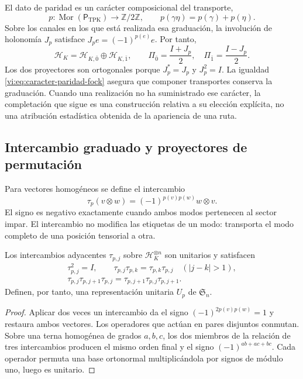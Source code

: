 El dato de paridad es un carácter composicional del transporte,
\begin{equation}
 p:\operatorname{Mor}(\mathsf P_{\mathrm{TPK}})
 \longrightarrow\mathbb Z/2\mathbb Z,
 \qquad p(\gamma\eta)=p(\gamma)+p(\eta).
 \label{vi:eq:caracter-paridad-fock}
\end{equation}
Sobre los canales en los que está realizada esa graduación, la
involución de holonomía \(J_p\) satisface
\(J_pe=(-1)^{p(e)}e\). Por tanto,
\[
 \mathcal H_K=\mathcal H_{K,\bar0}\oplus\mathcal H_{K,\bar1},
 \qquad \Pi_{\bar0}=\frac{I+J_p}{2},\quad
 \Pi_{\bar1}=\frac{I-J_p}{2}.
\]
Los dos proyectores son ortogonales porque \(J_p^*=J_p\) y
\(J_p^2=I\). La igualdad \eqref{vi:eq:caracter-paridad-fock} asegura
que componer transportes conserva la graduación. Cuando una realización
no ha suministrado ese carácter, la completación que sigue es una
construcción relativa a su elección explícita, no una atribución
estadística obtenida de la apariencia de una ruta.

\subsection{Intercambio graduado y proyectores de permutación}
\label{vi:subsec:intercambio-graduado}

Para vectores homogéneos se define el intercambio
\begin{equation}
 \tau_p(v\otimes w)=(-1)^{p(v)p(w)}w\otimes v.
 \label{vi:eq:intercambio-graduado}
\end{equation}
El signo es negativo exactamente cuando ambos modos pertenecen al
sector impar. El intercambio no modifica las etiquetas de un modo:
transporta el modo completo de una posición tensorial a otra.

\begin{proposition}
\label{vi:prop:permutaciones-graduadas}
Los intercambios adyacentes \(\tau_{p,j}\) sobre
\(\mathcal H_K^{\otimes n}\) son unitarios y satisfacen
\[
\begin{gathered}
 \tau_{p,j}^2=I,\qquad
 \tau_{p,j}\tau_{p,k}=\tau_{p,k}\tau_{p,j}\quad(|j-k|>1),\\
 \tau_{p,j}\tau_{p,j+1}\tau_{p,j}
 =\tau_{p,j+1}\tau_{p,j}\tau_{p,j+1}.
\end{gathered}
\]
Definen, por tanto, una representación unitaria \(U_p\) de
\(\mathfrak S_n\).
\end{proposition}
\begin{proof}
Aplicar dos veces un intercambio da el signo
\((-1)^{2p(v)p(w)}=1\) y restaura ambos vectores. Los operadores
que actúan en pares disjuntos conmutan. Sobre una terna homogénea
de grados \(a,b,c\), los dos miembros de la relación de tres
intercambios producen el mismo orden final y el signo
\((-1)^{ab+ac+bc}\). Cada operador permuta una base ortonormal
multiplicándola por signos de módulo uno, luego es unitario.
\end{proof}

